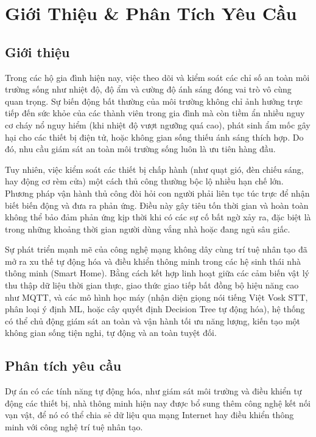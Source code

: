 
\section{Giới Thiệu \& Phân Tích Yêu Cầu}
\subsection{Giới thiệu}
Trong các hộ gia đình hiện nay, việc theo dõi và kiểm soát các chỉ số an toàn môi trường sống như nhiệt độ, độ ẩm và cường độ ánh sáng đóng vai trò vô cùng quan trọng. Sự biến động bất thường của môi trường không chỉ ảnh hưởng trực tiếp đến sức khỏe của các thành viên trong gia đình mà còn tiềm ẩn nhiều nguy cơ cháy nổ nguy hiểm (khi nhiệt độ vượt ngưỡng quá cao), phát sinh ẩm mốc gây hại cho các thiết bị điện tử, hoặc không gian sống thiếu ánh sáng thích hợp. Do đó, nhu cầu giám sát an toàn môi trường sống luôn là ưu tiên hàng đầu.

Tuy nhiên, việc kiểm soát các thiết bị chấp hành (như quạt gió, đèn chiếu sáng, hay động cơ rèm cửa) một cách thủ công thường bộc lộ nhiều hạn chế lớn. Phương pháp vận hành thủ công đòi hỏi con người phải liên tục túc trực để nhận biết biến động và đưa ra phản ứng. Điều này gây tiêu tốn thời gian và hoàn toàn không thể bảo đảm phản ứng kịp thời khi có các sự cố bất ngờ xảy ra, đặc biệt là trong những khoảng thời gian người dùng vắng nhà hoặc đang ngủ sâu giấc.

Sự phát triển mạnh mẽ của công nghệ mạng không dây cùng trí tuệ nhân tạo đã mở ra xu thế tự động hóa và điều khiển thông minh trong các hệ sinh thái nhà thông minh (Smart Home). Bằng cách kết hợp linh hoạt giữa các cảm biến vật lý thu thập dữ liệu thời gian thực, giao thức giao tiếp bất đồng bộ hiệu năng cao như MQTT, và các mô hình học máy (nhận diện giọng nói tiếng Việt Vosk STT, phân loại ý định ML, hoặc cây quyết định Decision Tree tự động hóa), hệ thống có thể chủ động giám sát an toàn và vận hành tối ưu năng lượng, kiến tạo một không gian sống tiện nghi, tự động và an toàn tuyệt đối.

\subsection{Phân tích yêu cầu}
Dự án có các tính năng tự động hóa, như giám sát môi trường và điều khiển tự
động các thiết bị, nhà thông minh hiện nay được bổ sung thêm công nghệ kết nối vạn vật, để nó có thể chia sẻ dữ liệu qua mạng Internet hay điều khiển thông minh với công nghệ trí tuệ nhân tạo.
